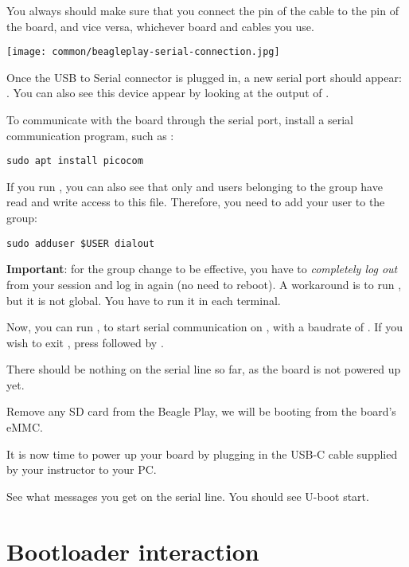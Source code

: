 You always should make sure that you connect the  pin of the cable
to the  pin of the board, and vice versa, whichever board and
cables you use.

\begin{center}
\texttt{[image: common/beagleplay-serial-connection.jpg]}
\end{center}

Once the USB to Serial connector is plugged in, a new serial port
should appear: .  You can also see this device
appear by looking at the output of .

To communicate with the board through the serial port, install a
serial communication program, such as :

\begin{verbatim}
sudo apt install picocom
\end{verbatim}

If you run , you can also see that only
 and users belonging to the  group have
read and write access to this file. Therefore, you need to add your user
to the  group:

\begin{verbatim}
sudo adduser $USER dialout
\end{verbatim}

{\bf Important}: for the group change to be effective, you have to
{\em completely log out} from your session and log in again (no need to
reboot). A workaround is to run , but it is not global.
You have to run it in each terminal.

Now, you can run , to start serial
communication on , with a baudrate of . If
you wish to exit , press \code{[Ctrl][a]} followed by
\code{[Ctrl][x]}.

There should be nothing on the serial line so far, as the board is not
powered up yet.

Remove any SD card from the Beagle Play, we will be booting from the board's
eMMC.

It is now time to power up your board by plugging in the USB-C
cable supplied by your instructor to your PC.

See what messages you get on the serial line. You should see U-boot
start.

\section{Bootloader interaction}

